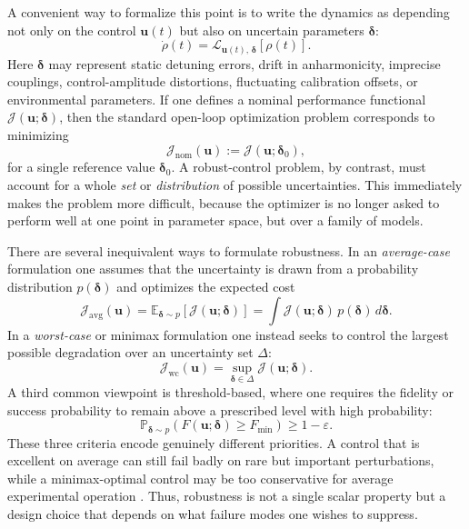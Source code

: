A convenient way to formalize this point is to write the dynamics as depending not only on the control $\bm{u}(t)$ but also on uncertain parameters $\bm{\delta}$:
\begin{equation}
\dot{\rho}(t)
=
\mathcal{L}_{\bm{u}(t),\,\bm{\delta}}[\rho(t)].
\label{eq:uncertain_quantum_dynamics}
\end{equation}
Here $\bm{\delta}$ may represent static detuning errors, drift in anharmonicity, imprecise couplings, control-amplitude distortions, fluctuating calibration offsets, or environmental parameters. If one defines a nominal performance functional $\mathcal{J}(\bm{u};\bm{\delta})$, then the standard open-loop optimization problem corresponds to minimizing
\begin{equation}
\mathcal{J}_{\mathrm{nom}}(\bm{u})
:=
\mathcal{J}(\bm{u};\bm{\delta}_{0}),
\label{eq:nominal_cost}
\end{equation}
for a single reference value $\bm{\delta}_0$. A robust-control problem, by contrast, must account for a whole \emph{set} or \emph{distribution} of possible uncertainties. This immediately makes the problem more difficult, because the optimizer is no longer asked to perform well at one point in parameter space, but over a family of models.

There are several inequivalent ways to formulate robustness. In an \emph{average-case} formulation one assumes that the uncertainty is drawn from a probability distribution $p(\bm{\delta})$ and optimizes the expected cost
\begin{equation}
\mathcal{J}_{\mathrm{avg}}(\bm{u})
=
\mathbb{E}_{\bm{\delta}\sim p}
\left[
\mathcal{J}(\bm{u};\bm{\delta})
\right]
=
\int
\mathcal{J}(\bm{u};\bm{\delta})\,
p(\bm{\delta})\,d\bm{\delta}.
\label{eq:average_case_robustness}
\end{equation}
In a \emph{worst-case} or minimax formulation one instead seeks to control the largest possible degradation over an uncertainty set $\Delta$:
\begin{equation}
\mathcal{J}_{\mathrm{wc}}(\bm{u})
=
\sup_{\bm{\delta}\in\Delta}
\mathcal{J}(\bm{u};\bm{\delta}).
\label{eq:worst_case_robustness}
\end{equation}
A third common viewpoint is threshold-based, where one requires the fidelity or success probability to remain above a prescribed level with high probability:
\begin{equation}
\mathbb{P}_{\bm{\delta}\sim p}
\!\left(
F(\bm{u};\bm{\delta}) \geq F_{\min}
\right)
\geq 1-\varepsilon.
\label{eq:chance_constraint_robustness}
\end{equation}
These three criteria encode genuinely different priorities. A control that is excellent on average can still fail badly on rare but important perturbations, while a minimax-optimal control may be too conservative for average experimental operation \cite{Weidner2025,Propson2022}. Thus, robustness is not a single scalar property but a design choice that depends on what failure modes one wishes to suppress.


